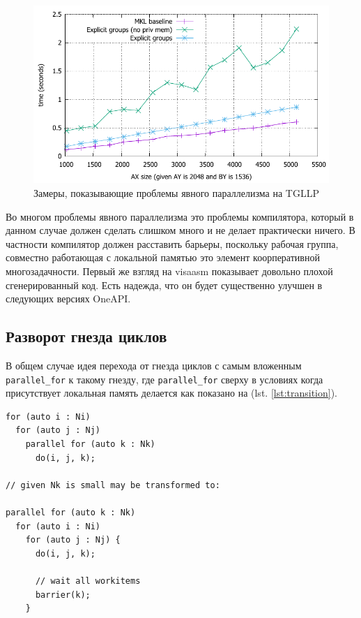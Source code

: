 \documentclass[a4paper,12pt,oneside]{article}
\begin{document}
\begin{figure}
\centering
\includegraphics[width=1.0\textwidth]{pictures/sgemm_groups.pdf}
\caption{Замеры, показывающие проблемы явного параллелизма на TGLLP}
\label{fig:sgemm_groups}
\end{figure}

Во многом проблемы явного параллелизма это проблемы компилятора, который в данном случае должен сделать слишком много и не делает практически ничего.
В частности компилятор должен расставить барьеры, поскольку рабочая группа, совместно работающая с локальной памятью это элемент коорперативной многозадачности.
Первый же взгляд на visaasm показывает довольно плохой сгенерированный код.
Есть надежда, что он будет существенно улучшен в следующих версиях OneAPI.

\subsection{Разворот гнезда циклов}\label{subsec:gemmtransform}

В общем случае идея перехода от гнезда циклов с самым вложенным \lstinline!parallel_for! к такому гнезду, где \lstinline!parallel_for! сверху в условиях когда присутствует локальная память делается как показано на (lst. \ref{lst:transition}).

\begin{lstlisting}[caption={Разворот гнезда циклов},label={lst:transition}]
for (auto i : Ni)
  for (auto j : Nj)    
    parallel for (auto k : Nk)
      do(i, j, k); 

// given Nk is small may be transformed to:

parallel for (auto k : Nk)
  for (auto i : Ni)
    for (auto j : Nj) {
      do(i, j, k); 

      // wait all workitems
      barrier(k);
    }
\end{lstlisting}
\end{document}
